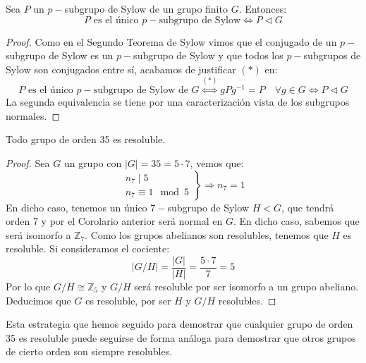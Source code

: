 \begin{coro}
    Sea $P$ un $p-$subgrupo de Sylow de un grupo finito $G$. Entonces:
    \begin{equation*}
        P \text{\ es el único $p-$subgrupo de Sylow} \Longleftrightarrow P\lhd G
    \end{equation*}
    \begin{proof}
        Como en el Segundo Teorema de Sylow vimos que el conjugado de un $p-$subgrupo de Sylow es un $p-$subgrupo de Sylow y que todos los $p-$subgrupos de Sylow son conjugados entre sí, acabamos de justificar $(\ast)$ en:
        \begin{equation*}
            P \text{\ es el único $p-$subgrupo de Sylow de $G$} \stackrel{(\ast)}{\Longleftrightarrow} gPg^{-1} = P \quad \forall g\in G \Longleftrightarrow P\lhd G
        \end{equation*}
        La segunda equivalencia se tiene por una caracterización vista de los subgrupos normales.
    \end{proof}
\end{coro}

\begin{ejemplo}
    Todo grupo de orden 35 es resoluble.
    \begin{proof}
        Sea $G$ un grupo con $|G| = 35 = 5\cdot 7$, vemos que:
        \begin{equation*}
            \left.\begin{array}{r}
                n_7 \mid 5 \\
                n_7\equiv 1 \mod 5
            \end{array}\right\} \Longrightarrow n_7 = 1
        \end{equation*}
        En dicho caso, tenemos un único $7-$subgrupo de Sylow $H<G$, que tendrá orden 7 y por el Corolario anterior será normal en $G$. En dicho caso, sabemos que será isomorfo a $\mathbb{Z}_7$. Como los grupos abelianos son resolubles, tenemos que $H$ es resoluble. Si consideramos el cociente:
        \begin{equation*}
            |G/H| = \dfrac{|G|}{|H|} = \dfrac{5\cdot 7}{7} = 5
        \end{equation*}
        Por lo que $G/H\cong \mathbb{Z}_5$ y $G/H$ será resoluble por ser isomorfo a un grupo abeliano. Deducimos que $G$ es resoluble, por ser $H$ y $G/H$ resolubles.
    \end{proof}
    \noindent
    Esta estrategia que hemos seguido para demostrar que cualquier grupo de orden 35 es resoluble puede seguirse de forma análoga para demostrar que otros grupos de cierto orden son siempre resolubles.
\end{ejemplo}

